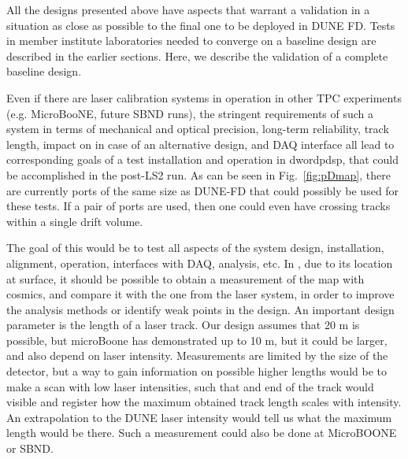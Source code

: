 

All the designs presented above have aspects that warrant a validation in a situation as close as possible to the final one to be deployed in DUNE FD. Tests in member institute laboratories needed to converge on a baseline design are described in the earlier sections. Here, we describe the validation of a complete baseline design.

Even if there are laser calibration systems in operation in other  TPC experiments (e.g. MicroBooNE, future SBND runs), the stringent requirements of such a system in terms of mechanical and optical precision, long-term reliability, track length, impact on \efield in case of an alternative design, and DAQ interface all lead to corresponding goals of a test installation and operation in dword{pdsp}, that could be accomplished in the post-LS2 run. As can be seen in Fig.~\ref{fig:pDmap}, there are currently ports of the same size as DUNE-FD that could possibly be used for these tests. If a pair of ports are used, then one could even have crossing tracks within a single drift volume. 

The goal of this would be to test all aspects of the system design, installation, alignment, operation, interfaces with DAQ, analysis, etc. In , due to its location at surface, it should be possible to obtain a measurement of the \efield map with cosmics, and compare it with the one from the laser system, in order to improve the analysis methods or identify weak points in the design. An important design parameter is the length of a laser track. Our design assumes that 20 m is possible, but microBoone has demonstrated up to 10 m, but it could be larger, and also depend on laser intensity. Measurements are limited by the size of the detector, but a way to gain information on possible higher lengths would be to make a scan with low laser intensities, such that and end of the track would visible and register how the maximum obtained track length scales with intensity. An extrapolation to the DUNE  laser intensity would tell us what the maximum length would be there. Such a measurement could also be done at 
MicroBOONE or SBND.

